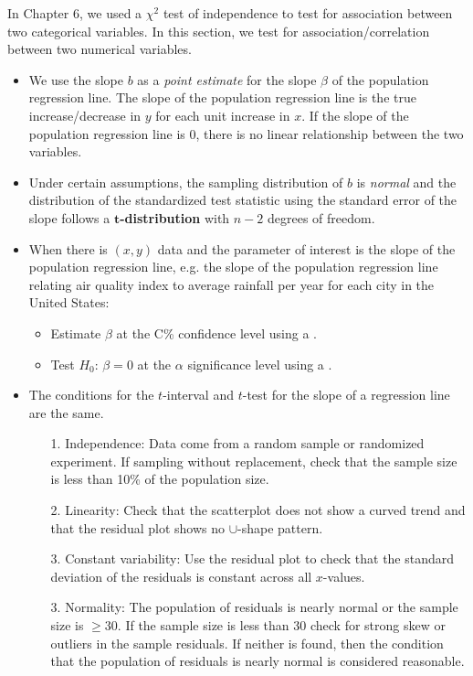 \noindent In Chapter 6, we used a $\chi^2$ test of independence to test for association between two categorical variables.  In this section, we test for association/correlation between two numerical variables.
\begin{itemize}
\item We use the slope $b$ as a \emph{point estimate} for the slope $\beta$ of the population regression line.  The slope of the population regression line is the true increase/decrease in $y$ for each unit increase in $x$.  If the slope of the population regression line is 0, there is no linear relationship between the two variables.  
\item Under certain assumptions, the sampling distribution of $b$ is \emph{normal} and the distribution of the standardized test statistic using the standard error of the slope follows a $\pmb{t}$\textbf{-distribution} with $n-2$ degrees of freedom.

\item When there is $(x, y)$ data and the parameter of interest is the slope of the population regression line, e.g. the slope of the population regression line relating air quality index to average rainfall per year for each city in the United States:
\begin{itemize}
\item Estimate $\beta$ at the C\% confidence level using a .
\item Test $H_0$: $\beta=0$ at the $\alpha$ significance level using a .
\end{itemize}
\item The conditions for the $t$-interval and $t$-test for the slope of a regression line are the same.
\begin{itemize}
\setlength{\itemsep}{0mm}
\item[1.] Independence:  Data come from a random sample or randomized experiment.  If sampling without replacement, check that the sample size is less than 10\% of the population size.
\item[2.] Linearity:  Check that the scatterplot does not show a curved trend and that the residual plot shows no $\cup$-shape pattern.  
\item[3.] Constant variability:  Use the residual plot to check that the standard deviation of the residuals is constant across all $x$-values.
\item[3.] Normality:  The population of residuals is nearly normal or the sample size is $\ge 30$.  If the sample size is less than 30 check for strong skew or outliers in the sample residuals.  If neither is found, then the condition that the population of residuals is nearly normal is considered reasonable.  


\end{itemize}
\end{itemize}
